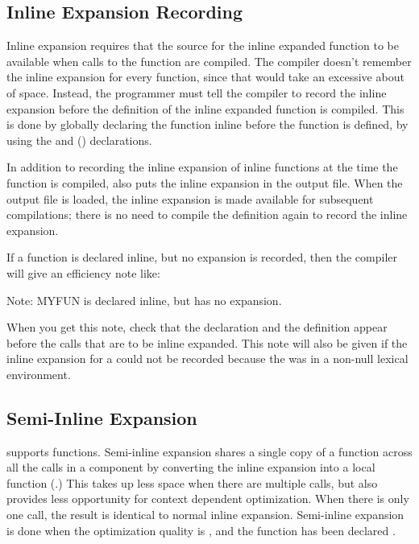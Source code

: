 \subsection{Inline Expansion Recording}

Inline expansion requires that the source for the inline expanded function to
be available when calls to the function are compiled.  The compiler doesn't
remember the inline expansion for every function, since that would take an
excessive about of space.  Instead, the programmer must tell the compiler to
record the inline expansion before the definition of the inline expanded
function is compiled.  This is done by globally declaring the function inline
before the function is defined, by using the  and
 ()
declarations.

In addition to recording the inline expansion of inline functions at the time
the function is compiled,  also puts the inline expansion in
the output file.  When the output file is loaded, the inline expansion is made
available for subsequent compilations; there is no need to compile the
definition again to record the inline expansion.

If a function is declared inline, but no expansion is recorded, then the
compiler will give an efficiency note like:

\begin{example}
Note: MYFUN is declared inline, but has no expansion.
\end{example}

When you get this note, check that the  declaration and the
definition appear before the calls that are to be inline expanded.  This note
will also be given if the inline expansion for a  could not be
recorded because the  was in a non-null lexical environment.


\subsection{Semi-Inline Expansion}
\label{semi-inline}

\python{} supports  functions.  Semi-inline expansion
shares a single copy of a function across all the calls in a component
by converting the inline expansion into a local function
(.)  This takes up less space when there are
multiple calls, but also provides less opportunity for context
dependent optimization.  When there is only one call, the result is
identical to normal inline expansion.  Semi-inline expansion is done
when the  optimization quality is , and the
function has been declared .

